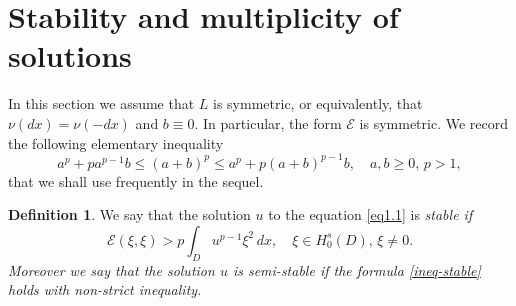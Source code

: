 \documentclass[11pt,a4paper,reqno]{amsart}
\theoremstyle{definition}
\newtheorem{definition}[theorem]{Definition}
\numberwithin{equation}{section}
\begin{document}
\section{Stability and multiplicity of solutions}
\label{sec8}

In this section we assume that $L$ is symmetric, or equivalently, that $\nu(dx)=\nu(-dx)$ and $b\equiv 0$.
In particular, the form $\mathcal E$ is symmetric. We record the following elementary inequality
\begin{equation}
\label{eq.el1}
a^p+pa^{p-1}b\le (a+b)^p\le a^p+p(a+b)^{p-1}b,\quad a,b\ge 0,\, p>1,
\end{equation}
that we shall use frequently in the sequel.


\begin{definition}
We say that the solution $u$ to the equation \eqref{eq1.1} is \em{stable} if
\begin{equation}\label{ineq-stable}
\mathcal E(\xi,\xi)>p\int_D u^{p-1} \xi^2\,dx,\quad\xi\in H^s_0(D),\, \xi\neq 0.
\end{equation}
Moreover we say that the solution $u$ is \em{semi-stable} if the formula \eqref{ineq-stable} holds with non-strict inequality.
\end{definition}
\end{document}
